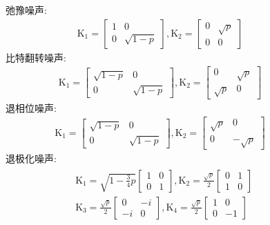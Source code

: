 \documentclass[a4paper,11pt,english]{sphinxmanual}
\begin{document}
\sphinxAtStartPar
  弛豫噪声:
\begin{equation*}
\begin{split}\mathrm{K}_{1}=\left[\begin{array}{cc} 1 & 0 \\ 0 & \sqrt{1-p} \end{array}\right], \mathrm{K}_{2}=\left[\begin{array}{cc} 0 & \sqrt{p} \\ 0 & 0 \end{array}\right]\end{split}
\end{equation*}
\sphinxAtStartPar
  比特翻转噪声:
\begin{equation*}
\begin{split}\mathrm{K}_{1}=\left[\begin{array}{cc} \sqrt{1-p} & 0 \\ 0 & \sqrt{1-p} \end{array}\right], \mathrm{K}_{2}=\left[\begin{array}{cc} 0 & \sqrt{p} \\ \sqrt{p} & 0 \end{array}\right]\end{split}
\end{equation*}
\sphinxAtStartPar
  退相位噪声:
\begin{equation*}
\begin{split}\mathrm{K}_{1}=\left[\begin{array}{cc} \sqrt{1-p} & 0 \\ 0 & \sqrt{1-p} \end{array}\right], \mathrm{K}_{2}=\left[\begin{array}{cc} \sqrt{p} & 0 \\ 0 & -\sqrt{p} \end{array}\right]\end{split}
\end{equation*}
\sphinxAtStartPar
  退极化噪声:
\begin{equation*}
\begin{split}\begin{aligned} &\mathrm{K}_{1}=\sqrt{1-\frac{3}{4} p}\left[\begin{array}{ll} 1 & 0 \\ 0 & 1 \end{array}\right], \mathrm{K}_{2}=\frac{\sqrt{p}}{2}\left[\begin{array}{ll} 0 & 1 \\ 1 & 0 \end{array}\right] \\ &\mathrm{K}_{3}=\frac{\sqrt{p}}{2}\left[\begin{array}{cc} 0 & -i \\ -i & 0 \end{array}\right], \mathrm{K}_{4}=\frac{\sqrt{p}}{2}\left[\begin{array}{cc} 1 & 0 \\ 0 & -1 \end{array}\right] \end{aligned}\end{split}
\end{equation*}
\sphinxAtStartPar
{}
\end{document}
